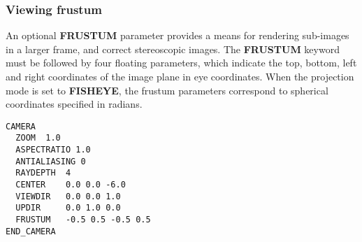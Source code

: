 \subsubsection{Viewing frustum}
An optional {\bf FRUSTUM} parameter provides a means for rendering sub-images
in a larger frame, and correct stereoscopic images.  The {\bf FRUSTUM}
keyword must be followed by four floating parameters, which indicate
the top, bottom, left and right coordinates of the image plane in 
eye coordinates.   When the projection mode is set to {\bf FISHEYE},
the frustum parameters correspond to spherical coordinates specified
in radians.

\begin{verbatim}
CAMERA
  ZOOM  1.0
  ASPECTRATIO 1.0
  ANTIALIASING 0
  RAYDEPTH  4
  CENTER    0.0 0.0 -6.0
  VIEWDIR   0.0 0.0 1.0
  UPDIR     0.0 1.0 0.0
  FRUSTUM   -0.5 0.5 -0.5 0.5
END_CAMERA
\end{verbatim}


